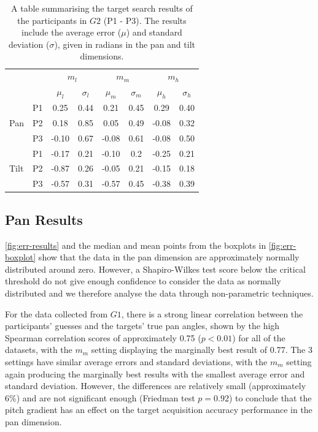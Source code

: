 \documentclass{llncs}
\begin{document}
\begin{table}
  \centering
  \caption{A table summarising the target search results of the participants in $G2$ (P1 - P3). The results include the average error ($\mu$) and standard deviation ($\sigma$), given in radians in the pan and tilt dimensions.}\label{tab:vi-results}
  \begin{tabular}{llcccccc}
    \toprule
    \multicolumn{2}{c}{} & \multicolumn{2}{c}{$m_l$} & \multicolumn{2}{c}{$m_m$} & \multicolumn{2}{c}{$m_h$} \\
    \multicolumn{2}{c}{} & $\mu_l$ & $\sigma_l$ & $\mu_m$ & $\sigma_m$ & $\mu_h$ & $\sigma_h$ \\\midrule
	 & P1 &  0.25 & 0.44 &  0.21 & 0.45 &  0.29 & 0.40 \\%
    Pan  & P2 &  0.18 & 0.85 &  0.05 & 0.49 & -0.08 & 0.32 \\%
	 & P3 & -0.10 & 0.67 & -0.08 & 0.61 & -0.08 & 0.50 \\ \midrule
	 & P1 & -0.17 & 0.21 & -0.10 & 0.2  & -0.25 & 0.21 \\%
    Tilt & P2 & -0.87 & 0.26 & -0.05 & 0.21 & -0.15 & 0.18 \\%
	 & P3 & -0.57 & 0.31 & -0.57 & 0.45 & -0.38 & 0.39 \\%
    \bottomrule
  \end{tabular}
\end{table}

\subsection{Pan Results}

\cref{fig:err-results} and the median and mean points from the boxplots in \cref{fig:err-boxplot} show that the data in the pan dimension are approximately normally distributed around zero.
However, a Shapiro-Wilkes test score below the critical threshold do not give enough confidence to consider the data as normally distributed and we therefore analyse the data through non-parametric techniques. 

For the data collected from $G1$, there is a strong linear correlation between the participants' guesses and the targets' true pan angles, shown by the high Spearman correlation scores of approximately 0.75 ($p < 0.01$) for all of the datasets, with the $m_m$ setting displaying the marginally best result of 0.77.
The 3 settings have similar average errors and standard deviations, with the $m_m$ setting again producing the marginally best results with the smallest average error and standard deviation.
However, the differences are relatively small (approximately 6\%) and are not significant enough (Friedman test $p = 0.92$) to conclude that the pitch gradient has an effect on the target acquisition accuracy performance in the pan dimension. 
\end{document}
